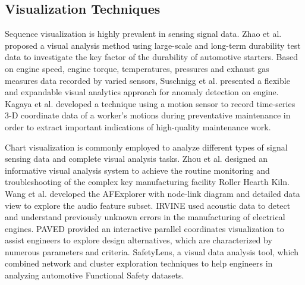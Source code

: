 \documentclass[a4paper,fleqn]{cas-dc}
\begin{document}
\subsection{Visualization Techniques}
Sequence visualization is highly prevalent in sensing signal data.
Zhao et al. \cite{zhao2019visual} proposed a visual analysis method using large-scale and long-term durability test data to  investigate the key factor of the durability of automotive starters.
Based on engine speed, engine torque, temperatures, pressures and exhaust gas measures data recorded by varied sensors, Suschnigg et al. \cite{suschnigg2020exploration} presented a flexible and expandable visual analytics approach for anomaly detection on engine.
Kagaya et al. \cite{Kagaya2017} developed a technique using a motion sensor to record time-series 3-D coordinate data of a worker's motions during preventative maintenance in order to extract important indications of high-quality maintenance work.

Chart visualization is commonly employed to analyze different types of signal sensing data and complete visual analysis tasks.
Zhou et al. \cite{Zhou2018} designed an informative visual analysis system to achieve the routine monitoring and troubleshooting of the complex key manufacturing facility Roller Hearth Kiln.
Wang et al. \cite{Wang2022} developed the AFExplorer with node-link diagram and detailed data view to explore the audio feature subset.
IRVINE \cite{eirich2021irvine} used acoustic data to detect and understand previously unknown errors in the manufacturing of electrical engines.
PAVED \cite{cibulski2020paved} provided an interactive parallel coordinates visualization to assist engineers to explore design alternatives, which are characterized by numerous parameters and criteria.
SafetyLens, \cite{narechania2020safetylens}a visual data analysis tool, which combined network and cluster exploration techniques to help engineers in analyzing automotive Functional Safety datasets.
\end{document}
